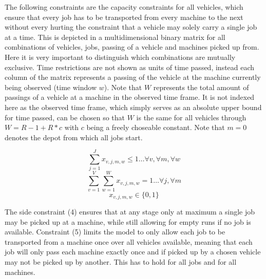 The following constraints are the capacity constraints for all vehicles, which ensure that every job has to be transported from every machine to the
next without every hurting the constraint that a vehicle may solely carry a single job at a time. This is depicted in a multidimensional binary matrix
for all combinations of vehicles, jobs, passing of a vehicle and machines picked up from. Here it is very important to distinguish which combinations are mutually exclusive.
Time restrictions are not shown as units of time passed, instead each column of the matrix represents a passing of the vehicle at the machine currently
being observed (time window \(w\)). Note that \(W\) represents the total amount of passings of a vehicle at a machine in the observed time frame. It
is not indexed here as the observed time frame, which simply serves as an absolute upper bound for time passed, can be chosen so that \(W\) is the same
for all vehicles through \(W = R - 1 + R * c\) with \(c\) being a freely choseable constant. Note that \(m = 0\) denotes the depot from which all jobs
start.

\begin{equation}
 \sum_{j=1}^{J}x_{v,j,m,w} \leq 1 \ldots \forall v, \forall m, \forall w 
\end{equation}
\begin{equation}
 \sum_{v=1}^{V}\sum_{w=1}^{W}x_{v,j,m,w} = 1 \ldots \forall j, \forall m
\end{equation}
\begin{equation}
 x_{v,j,m,w} \in \{0,1\}
\end{equation}

The side constraint (4) ensures that at any stage only at maximum a single job may be picked up at a machine, while still allowing for empty runs if no job
is available. Constraint (5) limits the model to only allow each job to be transported from a machine once over all vehicles available, meaning that
each job will only pass each machine exactly once and if picked up by a chosen vehicle may not be picked up by another. This has to hold for all jobs
and for all machines.

